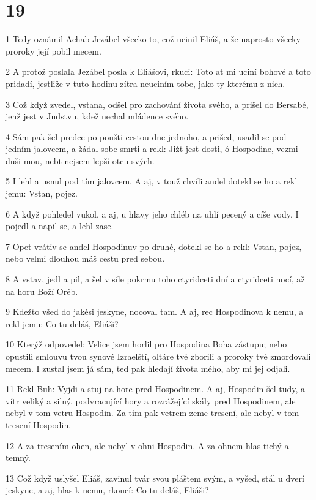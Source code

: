 \chapter{19}

\par 1 Tedy oznámil Achab Jezábel všecko to, což ucinil Eliáš, a že naprosto všecky proroky její pobil mecem.
\par 2 A protož poslala Jezábel posla k Eliášovi, rkuci: Toto at mi uciní bohové a toto pridadí, jestliže v tuto hodinu zítra neuciním tobe, jako ty kterému z nich.
\par 3 Což když zvedel, vstana, odšel pro zachování života svého, a prišel do Bersabé, jenž jest v Judstvu, kdež nechal mládence svého.
\par 4 Sám pak šel predce po poušti cestou dne jednoho, a prišed, usadil se pod jedním jalovcem, a žádal sobe smrti a rekl: Jižt jest dosti, ó Hospodine, vezmi duši mou, nebt nejsem lepší otcu svých.
\par 5 I lehl a usnul pod tím jalovcem. A aj, v touž chvíli andel dotekl se ho a rekl jemu: Vstan, pojez.
\par 6 A když pohledel vukol, a aj, u hlavy jeho chléb na uhlí pecený a cíše vody. I pojedl a napil se, a lehl zase.
\par 7 Opet vrátiv se andel Hospodinuv po druhé, dotekl se ho a rekl: Vstan, pojez, nebo velmi dlouhou máš cestu pred sebou.
\par 8 A vstav, jedl a pil, a šel v síle pokrmu toho ctyridceti dní a ctyridceti nocí, až na horu Boží Oréb.
\par 9 Kdežto všed do jakési jeskyne, nocoval tam. A aj, rec Hospodinova k nemu, a rekl jemu: Co tu deláš, Eliáši?
\par 10 Kterýž odpovedel: Velice jsem horlil pro Hospodina Boha zástupu; nebo opustili smlouvu tvou synové Izraelští, oltáre tvé zborili a proroky tvé zmordovali mecem. I zustal jsem já sám, ted pak hledají života mého, aby mi jej odjali.
\par 11 Rekl Buh: Vyjdi a stuj na hore pred Hospodinem. A aj, Hospodin šel tudy, a vítr veliký a silný, podvracující hory a rozrážející skály pred Hospodinem, ale nebyl v tom vetru Hospodin. Za tím pak vetrem zeme tresení, ale nebyl v tom tresení Hospodin.
\par 12 A za tresením ohen, ale nebyl v ohni Hospodin. A za ohnem hlas tichý a temný.
\par 13 Což když uslyšel Eliáš, zavinul tvár svou pláštem svým, a vyšed, stál u dverí jeskyne, a aj, hlas k nemu, rkoucí: Co tu deláš, Eliáši?
